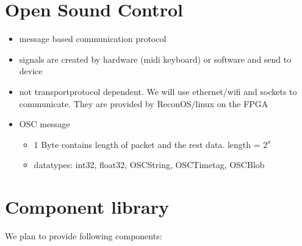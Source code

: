 \section{Open Sound Control}
\begin{itemize}
\item{message based communication protocol}
\item{signals are created by hardware (midi keyboard) or software and send to device}
\item{not transportprotocol dependent. We will use ethernet/wifi and sockets to communicate. They are provided by ReconOS/linux on the FPGA}
\item{OSC message}
\begin{itemize}
\item{1 Byte contains length of packet and the rest data. length = $2^x$}
\item{datatypes: int32, float32, OSCString, OSCTimetag, OSCBlob}
\end{itemize}
\end{itemize}

\section{Component library}
We plan to provide following components:


